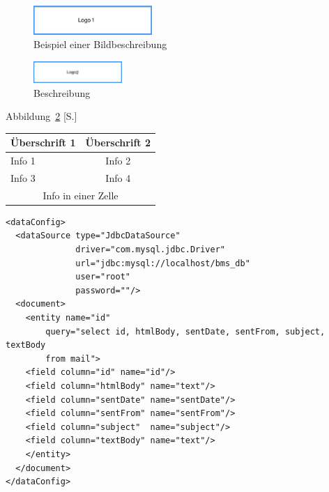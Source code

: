 \begin{figure}[htb]
 \centering
 \includegraphics[width=0.4\textwidth,angle=45]{abb/logo1}
 \caption[Beispiel einer Bildbeschreibung]{Beispiel einer Bildbeschreibung\footnotemark}
\label{fig:beispiel1}
\end{figure}

\begin{figure}[htb]
 \centering
 \includegraphics[width=0.3\textwidth,angle=0]{abb/logo2}
 \caption[Beschreibung]{Beschreibung}
\label{fig:Beschreibung}
\end{figure}

Abbildung~\ref{fig:Beschreibung} [S.\pageref{fig:Beschreibung}]

\begin{center}
  \begin{tabular}{ | l | c | }
    \hline
    Überschrift 1 & Überschrift 2 \\ \hline \hline
    Info 1 & Info 2 \\ \hline
    Info 3 & Info 4 \\ \hline
    \hline
    \multicolumn{2}{|c|}{Info in einer Zelle} \\
    \hline
  \end{tabular}
\end{center}


\lstset{language=xml}
\begin{lstlisting}[frame=htrbl, caption={Die Datei {\tt data-config.xml} dient als Beispiel für XML Quellcode}, label={lst:dataconfigxml}]
<dataConfig>
  <dataSource type="JdbcDataSource" 
              driver="com.mysql.jdbc.Driver"
              url="jdbc:mysql://localhost/bms_db"
              user="root" 
              password=""/>
  <document>
    <entity name="id"
        query="select id, htmlBody, sentDate, sentFrom, subject, textBody
        from mail">
    <field column="id" name="id"/>
    <field column="htmlBody" name="text"/>
    <field column="sentDate" name="sentDate"/>
    <field column="sentFrom" name="sentFrom"/>
    <field column="subject"  name="subject"/>
    <field column="textBody" name="text"/>
    </entity>
  </document>
</dataConfig>
\end{lstlisting}

